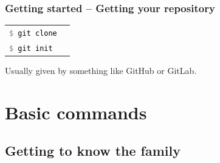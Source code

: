 \documentclass{beamer}
\newcommand{\command}[1]{\colorbox{black!90!white!10!}{\vphantom{Ep}\texttt{\textcolor{gray}{\$} \textcolor{black}{#1}}}}
\begin{document}
\begin{frame}[fragile]
  \frametitle{Getting started -- Getting your repository}
  \begin{tabular}{ll}
    \command{git clone} & \\
    \command{git init} & \\
  \end{tabular}
  \vspace{1em}
  Usually given by something like GitHub or GitLab.
\end{frame}


\section{Basic commands}
\subsection{Getting to know the family}
\end{document}
